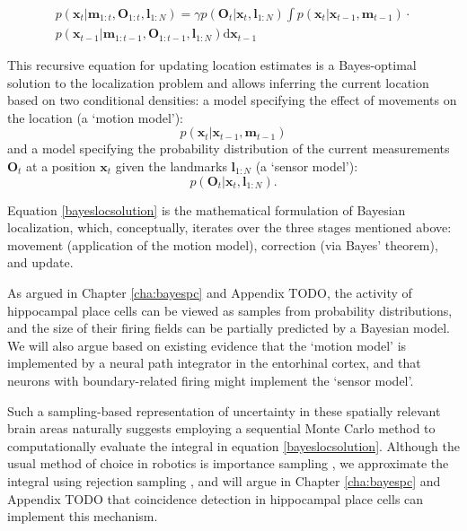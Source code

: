 \begin{equation}
\label{bayeslocsolution}
\begin{split}
p(\bm x_{t} | \bm m_{1:t}, \bm O_{1:t}, \bm l_{1:N}) = \gamma p(\bm O_{t} | \bm x_{t}, \bm l_{1:N}) \int p(\bm x_{t} | \bm x_{t-1}, \bm m_{t-1}) \cdot \\
 p(\bm x_{t-1} | \bm m_{1:t-1}, \bm O_{1:t-1}, \bm l_{1:N}) \mathrm{d} \bm x_{t-1}
\end{split}
\end{equation}

This recursive equation for updating location estimates is a Bayes-optimal solution to the localization problem and allows inferring the current location based on two conditional densities: a model specifying the effect of movements on the location (a `motion model'):
\begin{equation}\label{motionmodelq}
p(\bm x_{t} | \bm x_{t-1}, \bm m_{t-1})
\end{equation}
and a model specifying the probability distribution of the current measurements $ \bm O_{t} $ at a position $ \bm x_{t} $ given the landmarks $ \bm l_{1:N} $ (a `sensor model'):
\begin{equation}\label{sensormodelq}
p(\bm O_{t} | \bm x_{t}, \bm l_{1:N}).
\end{equation}

Equation \ref{bayeslocsolution} is the mathematical formulation of Bayesian localization, which, conceptually, iterates over the three stages mentioned above: movement (application of the motion model), correction (via Bayes' theorem), and update.

As argued in Chapter \ref{cha:bayespc} and Appendix TODO, the activity of hippocampal place cells can be viewed as samples from probability distributions, and the size of their firing fields can be partially predicted by a Bayesian model. We will also argue based on existing evidence that the `motion model' is implemented by a neural path integrator in the entorhinal cortex, and that neurons with boundary-related firing might implement the `sensor model'.

Such a sampling-based representation of uncertainty in these spatially relevant brain areas naturally suggests employing a sequential Monte Carlo method \citep{doucet2000sequential} to computationally evaluate the integral in equation \ref{bayeslocsolution}. Although the usual method of choice in robotics is importance sampling \citep{montemerlo2007fastslam, thrun2005probabilistic}, we approximate the integral using rejection sampling \citep{doucet2000sequential}, and will argue in Chapter \ref{cha:bayespc} and Appendix TODO that coincidence detection in hippocampal place cells can implement this mechanism.

